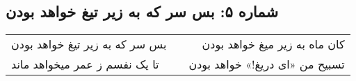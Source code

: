 \begin{center}
\section*{شماره ۵: بس سر که به زیر تیغ خواهد بودن}
\label{sec:005}
\begin{longtable}{l p{0.5cm} r}
بس سر که به زیر تیغ خواهد بودن
&&
کان ماه به زیر میغ خواهد بودن
\\
تا یک نفسم ز عمر میخواهد ماند
&&
تسبیح من «ای دریغ!» خواهد بودن
\\
\end{longtable}
\end{center}
